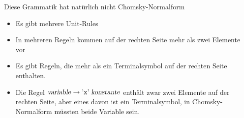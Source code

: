 \begin{loesung}
Diese Grammatik hat natürlich nicht Chomsky-Normalform
\begin{itemize}
\item Es gibt mehrere Unit-Rules
\item In mehreren Regeln kommen auf der rechten Seite mehr als
zwei Elemente vor
\item Es gibt Regeln, die mehr als ein Terminalsymbol auf der rechten
Seite enthalten.
\item Die Regel
$\text{\textsl{variable}}\to \text{'{\tt x}'}\;\text{\textsl{konstante}}$
enthält zwar zwei Elemente auf der rechten Seite, aber eines davon
ist ein Terminalsymbol, in Chomsky-Normalform müssten beide Variable
sein.
\qedhere
\end{itemize}
\end{loesung}
